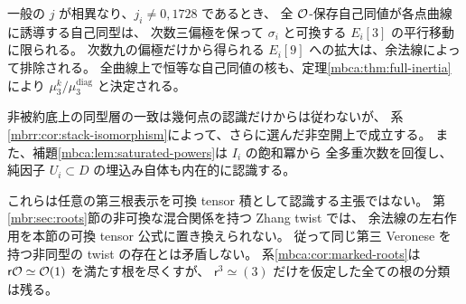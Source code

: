 \begin{remark}
一般の $j$ が相異なり、$j_i\ne0,1728$ であるとき、
全 $\mathcal O$-保存自己同値が各点曲線に誘導する自己同型は、
次数三偏極を保って $\sigma_i$ と可換する $E_i[3]$ の平行移動に限られる。
次数九の偏極だけから得られる $E_i[9]$ への拡大は、余法線によって排除される。
全曲線上で恒等な自己同値の核も、定理\ref{mbca:thm:full-inertia}により
$\mu_3^k/\mu_3^{\mathrm{diag}}$ と決定される。

非被約底上の同型層の一致は幾何点の認識だけからは従わないが、
系\ref{mbrr:cor:stack-isomorphism}によって、さらに選んだ非空開上で成立する。
また、補題\ref{mbca:lem:saturated-powers}は $I_i$ の飽和冪から
全多重次数を回復し、純因子 $U_i\subset D$ の埋込み自体も内在的に認識する。

これらは任意の第三根表示を可換 tensor 積として認識する主張ではない。
第\ref{mbr:sec:roots}節の非可換な混合関係を持つ Zhang twist では、
余法線の左右作用を本節の可換 tensor 公式に置き換えられない。
従って同じ第三 Veronese を持つ非同型の twist の存在とは矛盾しない。
系\ref{mbca:cor:marked-roots}は $\mathsf r\mathcal O\simeq\mathcal O(1)$ を満たす根を尽くすが、
$\mathsf r^3\simeq(3)$ だけを仮定した全ての根の分類は残る。
\end{remark}
